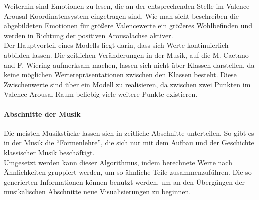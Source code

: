 \documentclass[11pt,a4paper]{article}
\begin{document}
\noindent
Weiterhin sind Emotionen zu lesen, die an der entsprechenden Stelle im Valence-Arousal Koordinatensystem eingetragen sind. Wie man sieht beschreiben die abgebildeten Emotionen für größere Valencewerte ein größeres Wohlbefinden und werden in Richtung der positiven Arousalachse aktiver.\\
Der Hauptvorteil eines Modells liegt darin, dass sich Werte kontinuierlich abbilden lassen. Die zeitlichen Veränderungen in der Musik, auf die M. Caetano and F. Wiering
 \cite{8a02f9c512933d46fbea928d23ac65e38b61b88caba9b38319a5d4952b5a6667} aufmerksam machen, lassen sich nicht über Klassen darstellen, da keine möglichen Werterepräsentationen zwischen den Klassen besteht. Diese Zwischenwerte sind über ein Modell zu realisieren, da zwischen zwei Punkten im Valence-Arousal-Raum beliebig viele weitere Punkte existieren.
 
\paragraph{Abschnitte der Musik}
Die meisten Musikstücke lassen sich in zeitliche Abschnitte unterteilen. So gibt es in der Musik die ``Formenlehre'', die sich nur mit dem Aufbau und der Geschichte klassischer Musik beschäftigt.\\
Umgesetzt werden kann dieser Algorithmus, indem berechnete Werte nach Ähnlichkeiten gruppiert werden, um so ähnliche Teile zusammenzuführen. Die so generierten Informationen können benutzt werden, um an den Übergängen der musikalischen Abschnitte neue Visualisierungen zu beginnen.
 
\end{document}
